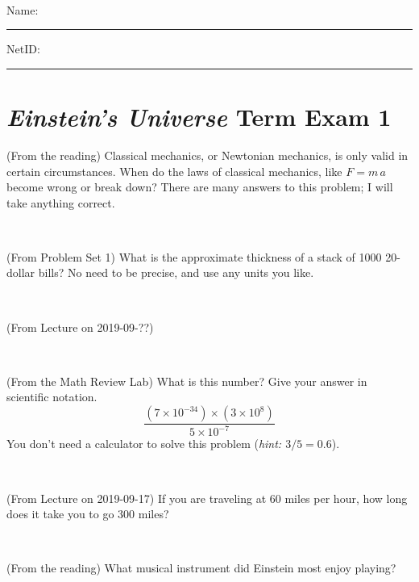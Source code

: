 \documentclass[12pt, letterpaper]{article}
\begin{document}
\vfill ~


\cleardoublepage



\noindent
Name: \rule[-1ex]{0.60\textwidth}{0.1pt}
NetID: \rule[-1ex]{0.20\textwidth}{0.1pt}

\section*{\textsl{Einstein's Universe} Term Exam 1}
\setcounter{problem}{1}


\begin{problem} (From the reading)
Classical mechanics, or Newtonian mechanics, is only valid in certain
circumstances. When do the laws of classical mechanics, like $F =
m\,a$ become wrong or break down? There are many answers to this
problem; I will take anything correct.
\end{problem}


\vfill ~

\begin{problem} (From Problem Set 1)
What is the approximate thickness of a stack of 1000 20-dollar bills?
No need to be precise, and use any units you like.
\end{problem}


\vfill ~

\begin{problem} (From Lecture on 2019-09-??)
\end{problem}


\vfill ~

\begin{problem} (From the Math Review Lab)
What is this number? Give your answer in scientific notation.
$$
\frac{(7\times10^{-34})\times(3\times10^8)}{5\times10^{-7}}
$$
You don't need a calculator to solve this problem (\textit{hint: $3/5=0.6$}).
\end{problem}


\vfill ~


\clearpage


\begin{problem} (From Lecture on 2019-09-17)
If you are traveling at 60 miles per hour, how long does
it take you to go 300 miles?
\end{problem}


\vfill ~

\begin{problem} (From the reading)
What musical instrument did Einstein most enjoy playing?
\end{problem}
\end{document}
